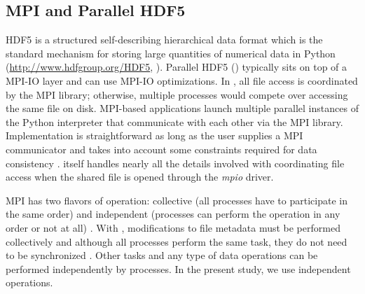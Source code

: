 \subsection{MPI and Parallel HDF5}
\label{sec:methods-hdf5}

HDF5 is a structured self-describing hierarchical data format which is the standard mechanism for storing large quantities of numerical data in Python (\url{http://www.hdfgroup.org/HDF5}, \cite{pythonhdf5}).
Parallel HDF5 () typically sits on top of a MPI-IO layer and can use MPI-IO optimizations. 
In , all file access is coordinated by the MPI library; otherwise, multiple processes would compete over accessing the same file on disk. 
MPI-based applications launch multiple parallel instances of the Python interpreter that communicate with each other via the MPI library. 
Implementation is straightforward as long as the user supplies a MPI communicator and takes into account some constraints required for data consistency \cite{pythonhdf5}.
 itself handles nearly all the details involved with coordinating file access when the shared file is opened through the \emph{mpio} driver.

MPI has two flavors of operation: collective (all processes have to participate in the same order) and independent (processes can perform the operation in any order or not at all) \cite{pythonhdf5}.
With , modifications to file metadata must be performed collectively and although all processes perform the same task, they do not need to be synchronized \cite{pythonhdf5}. 
Other tasks and any type of data operations can be performed independently by processes.
In the present study, we use independent operations.
